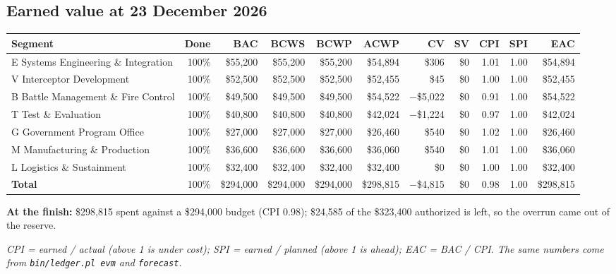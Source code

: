 \documentclass[12pt,letterpaper,oneside]{article}
\newcommand{\figfont}{\fontsize{9}{11}\selectfont}   %
\begin{document}
\subsection{Earned value at 23 December 2026}
{\figfont\setlength{\tabcolsep}{3pt}
\begin{tabular}{@{}l r r r r r r r r r r@{}}
\toprule
Segment & Done & BAC & BCWS & BCWP & ACWP & CV & SV & CPI & SPI & EAC \\
\midrule
E Systems Engineering \& Integration & 100\% & \$55,200 & \$55,200 & \$55,200 & \$54,894 & \$306 & \$0 & 1.01 & 1.00 & \$54,894 \\
V Interceptor Development & 100\% & \$52,500 & \$52,500 & \$52,500 & \$52,455 & \$45 & \$0 & 1.00 & 1.00 & \$52,455 \\
B Battle Management \& Fire Control & 100\% & \$49,500 & \$49,500 & \$49,500 & \$54,522 & $-$\$5,022 & \$0 & 0.91 & 1.00 & \$54,522 \\
T Test \& Evaluation & 100\% & \$40,800 & \$40,800 & \$40,800 & \$42,024 & $-$\$1,224 & \$0 & 0.97 & 1.00 & \$42,024 \\
G Government Program Office & 100\% & \$27,000 & \$27,000 & \$27,000 & \$26,460 & \$540 & \$0 & 1.02 & 1.00 & \$26,460 \\
M Manufacturing \& Production & 100\% & \$36,600 & \$36,600 & \$36,600 & \$36,060 & \$540 & \$0 & 1.01 & 1.00 & \$36,060 \\
L Logistics \& Sustainment & 100\% & \$32,400 & \$32,400 & \$32,400 & \$32,400 & \$0 & \$0 & 1.00 & 1.00 & \$32,400 \\
\midrule
\textbf{Total} & 100\% & \$294,000 & \$294,000 & \$294,000 & \$298,815 & $-$\$4,815 & \$0 & 0.98 & 1.00 & \$298,815 \\
\bottomrule
\end{tabular}}

\textbf{At the finish:} \$298,815 spent against a \$294,000 budget (CPI 0.98); \$24,585 of the \$323,400 authorized is left, so the overrun came out of the reserve.

{\figfont\itshape CPI = earned / actual (above 1 is under cost); SPI = earned / planned (above 1 is ahead); EAC = BAC / CPI. The same numbers come from \texttt{bin/ledger.pl evm} and \texttt{forecast}.\par}
\end{document}
